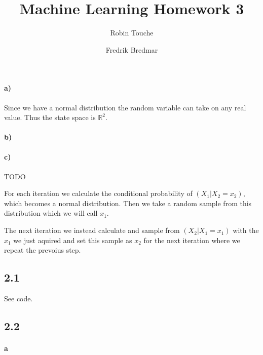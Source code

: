 \documentclass{article}
\author{
  Robin Touche \\
  \and
  Fredrik Bredmar
}
\title{Machine Learning Homework 3}
\begin{document}
\maketitle

\setcounter{section}{1}
\subsection{}
\paragraph{a)}

Since we have a normal distribution the random variable can take on any real
value. Thus the state space is $\mathbb{R}^2$.

\paragraph{b)}


\paragraph{c)}

TODO

For each iteration we calculate the conditional probability of $(X_1 \vert X_2
= x_2)$, which becomes a normal distribution. Then we take a random sample from
this distribution which we will call $x_1$.

The next iteration we instead calculate and sample from $(X_2 \vert X_1 = x_1)$
with the $x_1$ we just aquired and set this sample as $x_2$ for the next
iteration where we repeat the prevoius step.

\setcounter{section}{2}
\subsection*{2.1}

See code.

\subsection*{2.2}

\paragraph{a}
\end{document}
